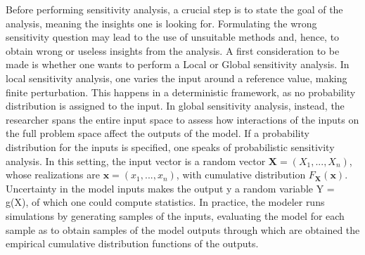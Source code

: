 Before performing sensitivity analysis, a crucial step is to state the goal of the analysis, meaning the insights one is looking for. Formulating the wrong sensitivity question may lead to the use of unsuitable methods and, hence, to obtain wrong or useless insights from the analysis. A first consideration to be made is whether one wants to perform a Local or Global sensitivity analysis. In local sensitivity analysis, one varies the input around a reference value, making finite perturbation. This happens in a deterministic framework, as no probability distribution is assigned to the input. In global sensitivity analysis, instead, the researcher spans the entire input space to assess how interactions of the inputs on the full problem space affect the outputs of the model. If a probability distribution for the inputs is specified, one speaks of probabilistic sensitivity analysis. In this setting, the input vector is a random vector $\textbf{X} = (X_1, ..., X_n)$, whose realizations are $\textbf{x} = (x_1, ..., x_n)$, with cumulative distribution $F_{\textbf{X}}(\textbf{x})$. Uncertainty in the model inputs makes the output y a random variable Y = g(X), of which one could compute statistics. In practice, the modeler runs simulations by generating samples of the inputs, evaluating the model for each sample as to obtain samples of the model outputs through which are obtained the empirical cumulative distribution functions of the outputs.

